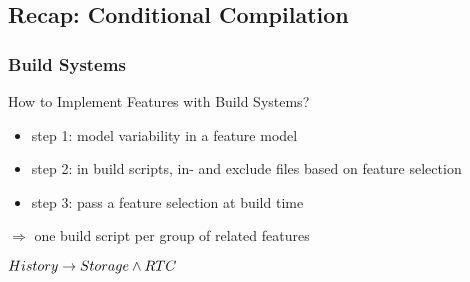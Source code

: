\subsection{Recap: Conditional Compilation}

\subsubsection*{Build Systems}

\begin{frame}{\myframetitle}
	\begin{mycolumns}[widths={60}]
		\begin{definition}{How to Implement Features with Build Systems?}
			\begin{itemize}
				\item step 1: model variability in a feature model
				\item step 2: in build scripts, in- and exclude files based on feature selection
				\item step 3: pass a feature selection at build time
			\end{itemize}
			$\Rightarrow$ one build script per group of related features
		\end{definition}
		\begin{exampletight}{}
			\centering

			$History \rightarrow Storage \wedge RTC$
		\end{exampletight}
	\mynextcolumn
		\begin{exampletight}{}
			\centering
			\pic[width=.65\linewidth]{pignap-features}
		\end{exampletight}
\end{mycolumns}
\end{frame}

